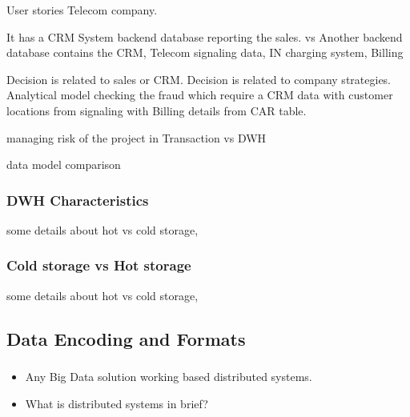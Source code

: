 User stories Telecom company.

It has a CRM System backend database reporting the sales. vs Another backend database contains the CRM, Telecom signaling data, IN charging system, Billing

Decision is related to sales or CRM. Decision is related to company strategies.
Analytical model checking the fraud which require a CRM data with customer locations from signaling with Billing details from CAR table.


managing risk of the project in Transaction vs DWH




data model comparison



\begin{frame}
\frametitle{DWH Characteristics}

some details about hot vs cold storage,

\end{frame}



\begin{frame}

\frametitle{Cold storage vs Hot storage}

some details about hot vs cold storage,

\end{frame}



\subsection{Data Encoding and Formats}
\begin{frame}
\frametitle{\subsecname}
\begin{itemize}[<+->]
	\item Any Big Data solution working based distributed systems.
	\item What is distributed systems in brief?
\end{itemize}
\end{frame}



